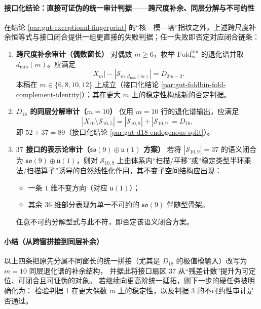 \paragraph{接口化结论：直接可证伪的统一审计判据——跨尺度补余、同层分解与不可约性}\label{par:gut-foldbin-fold-audit-criteria}
在结论 \ref{par:gut-exceptional-fingerprint} 的“核—模—塔”指纹之外，上述跨尺度补余恒等式与接口闭合提供一组更直接的失败判据；任一失败即否定对应闭合链条：
\begin{enumerate}
  \item \textbf{跨尺度补余审计（偶数窗长）} 对偶数 \(m\ge 6\)，枚举 \(\mathrm{Fold}^{\mathrm{bin}}_m\) 的退化谱并取 \(d_{\min}(m)\)。应满足
  \[
  |X_m|-|\mathcal{S}_{m,d_{\min}(m)}|=D_{2m-2}.
  \]
  本稿在 \(m\in\{6,8,10,12\}\) 上成立（接口化结论 \ref{par:gut-foldbin-fold-complement-identity}）；其在更大 \(m\) 上的稳定性构成新的否定判据。
  \item \textbf{\texorpdfstring{$D_{18}$}{D18} 的同层分解审计（\texorpdfstring{$m=10$}{m=10}）} 仅用 \(m=10\) 行的退化谱输出，应满足
  \[
  |X_{10}\setminus\mathcal{S}_{10,5}|=|\mathcal{S}_{10,8}|+|\mathcal{S}_{10,9}|=D_{18},
  \]
  即 \(52+37=89\)（接口化结论 \ref{par:gut-d18-endogenous-split}）。
  \item \textbf{\texorpdfstring{$37$}{37} 接口的表示论审计（\texorpdfstring{$\mathfrak{so}(9)\oplus\mathfrak{u}(1)$}{so(9)+u(1)} 方案）}
  若将 \(|\mathcal{S}_{10,9}|=37\) 的语义闭合为 \(\mathfrak{so}(9)\oplus\mathfrak{u}(1)\)，则对 \(\mathcal{S}_{10,9}\) 上由体系内“扫描/平移”或“稳定类型半环乘法/扫描算子”诱导的自然线性化作用，其不变子空间结构应出现：
  \begin{itemize}
    \item 一条 \(1\) 维不变方向（对应 \(\mathfrak{u}(1)\)）；
    \item 其余 \(36\) 维部分表现为单一不可约的 \(\mathfrak{so}(9)\) 伴随型骨架。
  \end{itemize}
  任意不可约分解型式与此不符，即否定该语义闭合方案。
\end{enumerate}

\paragraph{小结（从跨窗拼接到同层补余）}
以上四条把原先分属不同窗长的统一拼接（尤其是 \(D_{18}\) 的极值模输入）改写为 \(m=10\) 同层退化谱的补余结构，
并据此将接口扇区 \(37\) 从“残差计数”提升为可定位、可闭合且可证伪的对象。
若继续向更高阶统一延拓，则下一步的硬任务被明确化为：
检验判据 1 在更大偶数 \(m\) 上的稳定性，以及判据 3 的不可约性审计是否通过。

